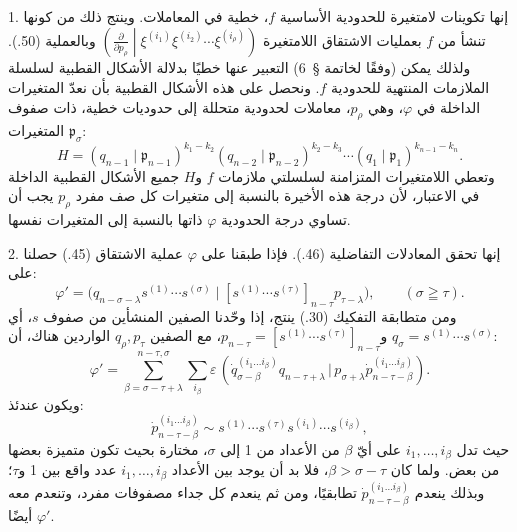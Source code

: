 \documentclass[11pt]{article}
\providecommand{\pair}[2]{(#1\,|\,#2)}
\providecommand{\eps}{\varepsilon}
\begin{document}
1. إنها تكوينات لامتغيرة للحدودية الأساسية $f$، خطية في المعاملات. وينتج ذلك من كونها تنشأ من $f$ بعمليات الاشتقاق اللامتغيرة $\left(\frac{\partial}{\partial p_\rho}\middle|\xi^{(i_1)}\xi^{(i_2)}\cdots\xi^{(i_\rho)}\right)$ وبالعملية (50.). ولذلك يمكن (وفقًا لخاتمة \S\ 6) التعبير عنها خطيًا بدلالة الأشكال القطبية لسلسلة الملازمات المنتهية للحدودية $f$. ونحصل على هذه الأشكال القطبية بأن نعدّ المتغيرات الداخلة في $\varphi$، وهي $p_\rho$، معاملات لحدودية متحللة إلى حدوديات خطية، ذات صفوف المتغيرات $\mathfrak{p}_\sigma$:
\begin{equation}
 H=(q_{n-1}\mid \mathfrak{p}_{n-1})^{k_1-k_2}(q_{n-2}\mid \mathfrak{p}_{n-2})^{k_2-k_3}\cdots(q_1\mid \mathfrak{p}_1)^{k_{n-1}-k_n}.
\tag{52}
\end{equation}
وتعطي اللامتغيرات المتزامنة لسلسلتي ملازمات $f$ و$H$ جميع الأشكال القطبية الداخلة في الاعتبار، لأن درجة هذه الأخيرة بالنسبة إلى متغيرات كل صف مفرد $p_\rho$ يجب أن تساوي درجة الحدودية $\varphi$ ذاتها بالنسبة إلى المتغيرات نفسها.

2. إنها تحقق المعادلات التفاضلية (46.). فإذا طبقنا على $\varphi$ عملية الاشتقاق (45.) حصلنا على:
\[
 \varphi'=\bigl(q_{n-\sigma-\lambda}s^{(1)}\cdots s^{(\sigma)}\mid [s^{(1)}\cdots s^{(\tau)}]_{n-\tau}p_{\tau-\lambda}\bigr),\qquad (\sigma\geqq\tau).
\]
ومن متطابقة التفكيك (30.) ينتج، إذا وحّدنا الصفين المنشأين من صفوف $s$، أي $q_\sigma=s^{(1)}\cdots s^{(\sigma)}$ و$p_{n-\tau}=[s^{(1)}\cdots s^{(\tau)}]_{n-\tau}$، مع الصفين $q_\rho,p_\tau$ الواردين هناك، أن:
\[
 \varphi'=\sum_{\beta=\sigma-\tau+\lambda}^{n-\tau,\sigma}\sum_{i_\beta}\eps\,
 \pair{\dot{q}_{\sigma-\beta}^{(i_1\ldots i_\beta)}q_{n-\tau+\lambda}}{p_{\sigma+\lambda}\dot{p}_{n-\tau-\beta}^{(i_1\ldots i_\beta)}}.
\]
ويكون عندئذ:
\[
 \dot{p}_{n-\tau-\beta}^{(i_1\ldots i_\beta)}\sim s^{(1)}\cdots s^{(\tau)}s^{(i_1)}\cdots s^{(i_\beta)},
\]
حيث تدل $i_1,\ldots,i_\beta$ على أيّ $\beta$ من الأعداد من 1 إلى $\sigma$، مختارة بحيث تكون متميزة بعضها من بعض. ولما كان $\beta>\sigma-\tau$، فلا بد أن يوجد بين الأعداد $i_1,\ldots,i_\beta$ عدد واقع بين 1 و$\tau$؛ وبذلك ينعدم $\dot{p}_{n-\tau-\beta}^{(i_1\ldots i_\beta)}$ تطابقيًا، ومن ثم ينعدم كل جداء مصفوفات مفرد، وتنعدم معه أيضًا $\varphi'$.
\end{document}
